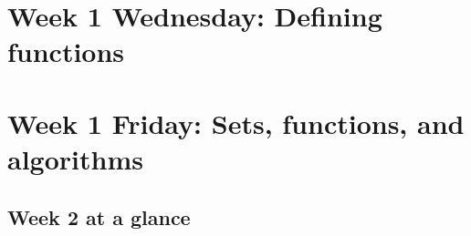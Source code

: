 \section*{Week 1 Wednesday: Defining functions}





\section*{Week 1 Friday: Sets, functions, and algorithms}

\newpage


\newpage

\subsection*{Week 2 at a glance}

